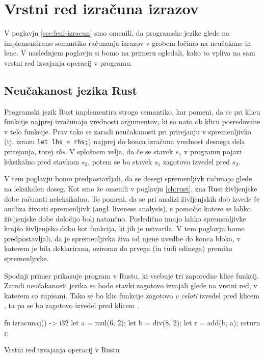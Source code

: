 \section{Vrstni red izračuna izrazov}

V poglavju \ref{sec:leni-izracun} smo omenili, da programske jezike glede na implementirano semantiko računanja izrazov v grobem ločimo na neučakane in lene. V naslednjem poglavju si bomo na primeru ogledali, kako to vpliva na sam vrstni red izvajanja operacij v programu.

\subsection{Neučakanost jezika Rust}

Programski jezik Rust implementira strogo semantiko, kar pomeni, da se pri klicu funkcije najprej izračunajo vrednosti argumentov, ki so nato ob klicu posredovane v telo funkcije. Prav tako se zaradi neučakanosti pri prirejanju v spremenljivko (tj. izrazu \texttt{let lhs = rhs;}) najprej do konca izračuna vrednost desnega dela prirejanja, torej \textit{rhs}. V splošnem velja, da če se stavek $s_1$ v programu pojavi leksikalno pred stavkom $s_2$, potem se bo stavek $s_1$ zagotovo izvedel pred $s_2$.

V tem poglavju bomo predpostavljali, da se dosegi spremenljivk računajo glede na leksikalen doseg. Kot smo že omenili v poglavju \ref{ch:rust}, zna Rust življenjske dobe računati neleksikalno. To pomeni, da se pri analizi živ\-ljenj\-skih dob izvede še analiza živosti spremenljivk (angl. liveness analysis), s pomočjo katere se lahko življenjske dobe določijo bolj natančno. Posledično imajo lahko spremenljivke krajšo življenjsko dobo kot funkcija, ki jih je ustvarila. V tem poglavju bomo predpostavljali, da je spremenljivka živa od njene uvedbe do konca bloka, v katerem je bila deklarirana, oziroma do prvega (in tudi edinega) premika spremenljivke.

Spodnji primer prikazuje program v Rustu, ki vsebuje tri zaporedne klice funkcij. Zaradi neučakanosti jezika se bodo stavki zagotovo izvajali glede na vrstni red, v katerem so zapisani. Tako se bo klic funkcije  zagotovo \emph{v celoti} izvedel pred klicem , ta pa se bo zagotovo izvedel pred klicem .

\begin{primer}[ht]
\centering
\begin{rust-success}
fn izracunaj() -> i32 {
    let a = mul(6, 2);
    let b = div(8, 2);
    let r = add(b, a);
    return r;
}
\end{rust-success}
\caption{Vrstni red izvajanja operacij v Rustu}
\label{pr:rust-vrstni-red-operacij}
\end{primer}


